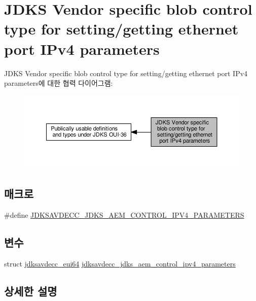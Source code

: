 \hypertarget{group__jdks__ipv4}{}\section{J\+D\+KS Vendor specific blob control type for setting/getting ethernet port I\+Pv4 parameters}
\label{group__jdks__ipv4}
J\+D\+KS Vendor specific blob control type for setting/getting ethernet port I\+Pv4 parameters에 대한 협력 다이어그램\+:
\nopagebreak
\begin{figure}[H]
\begin{center}
\leavevmode
\includegraphics[width=350pt]{group__jdks__ipv4}
\end{center}
\end{figure}
\subsection*{매크로}
\begin{DoxyCompactItemize}
\item 
\#define \hyperlink{group__jdks__ipv4_ga0300592382aa9b20451bbf611a680266}{J\+D\+K\+S\+A\+V\+D\+E\+C\+C\+\_\+\+J\+D\+K\+S\+\_\+\+A\+E\+M\+\_\+\+C\+O\+N\+T\+R\+O\+L\+\_\+\+I\+P\+V4\+\_\+\+P\+A\+R\+A\+M\+E\+T\+E\+RS}
\end{DoxyCompactItemize}
\subsection*{변수}
\begin{DoxyCompactItemize}
\item 
struct \hyperlink{structjdksavdecc__eui64}{jdksavdecc\+\_\+eui64} \hyperlink{group__jdks__ipv4_ga9e6a9013bc2267291e241cb6c5b2cf00}{jdksavdecc\+\_\+jdks\+\_\+aem\+\_\+control\+\_\+ipv4\+\_\+parameters}
\end{DoxyCompactItemize}


\subsection{상세한 설명}


